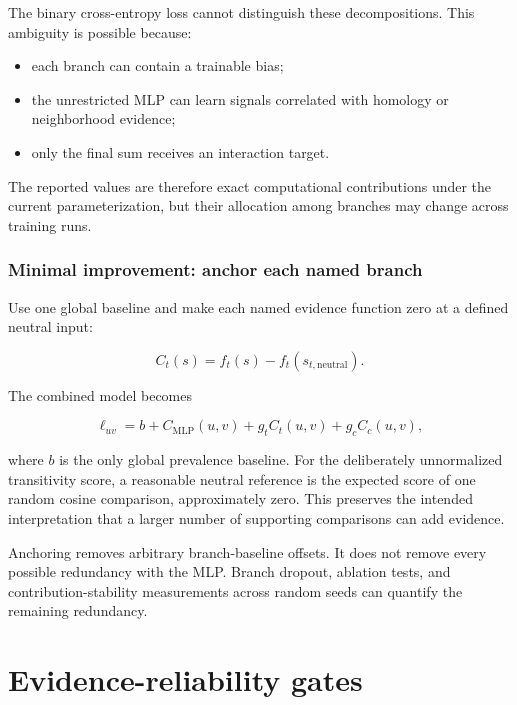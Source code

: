 \documentclass[11pt,a4paper]{article}
\begin{document}
The binary cross-entropy loss cannot distinguish these decompositions. This
ambiguity is possible because:

\begin{itemize}
  \item each branch can contain a trainable bias;
  \item the unrestricted MLP can learn signals correlated with homology or
        neighborhood evidence;
  \item only the final sum receives an interaction target.
\end{itemize}

The reported values are therefore exact computational contributions under the
current parameterization, but their allocation among branches may change across
training runs.

\subsubsection*{Minimal improvement: anchor each named branch}

Use one global baseline and make each named evidence function zero at a defined
neutral input:

\begin{equation}
  C_t(s) = f_t(s) - f_t(s_{t,\mathrm{neutral}}).
\end{equation}

The combined model becomes

\begin{equation}
  \ell_{uv}
  = b + C_{\mathrm{MLP}}(u,v)
  + g_t C_t(u,v) + g_c C_c(u,v),
\end{equation}

where $b$ is the only global prevalence baseline. For the deliberately
unnormalized transitivity score, a reasonable neutral reference is the expected
score of one random cosine comparison, approximately zero. This preserves the
intended interpretation that a larger number of supporting comparisons can add
evidence.

Anchoring removes arbitrary branch-baseline offsets. It does not remove every
possible redundancy with the MLP. Branch dropout, ablation tests, and
contribution-stability measurements across random seeds can quantify the
remaining redundancy.

\section{Evidence-reliability gates}
\end{document}

